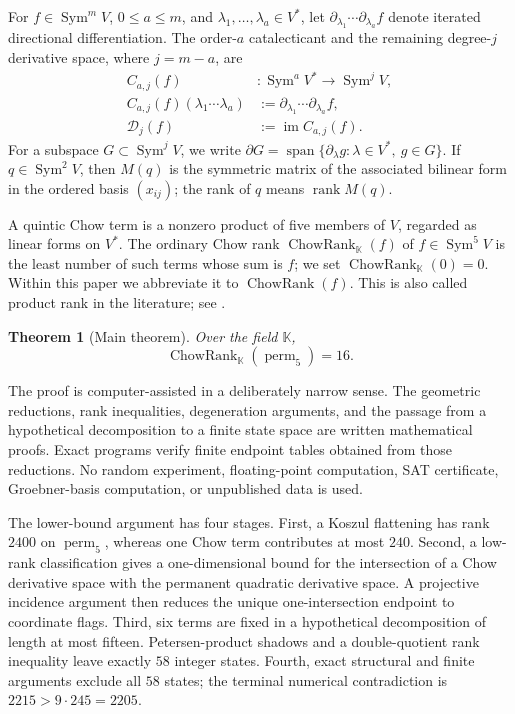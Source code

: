 \documentclass[11pt,reqno]{amsart}
\newtheorem{theorem}{Theorem}[section]
\theoremstyle{definition}
\newcommand{\K}{\mathbb K}
\newcommand{\Sym}{\operatorname{Sym}}
\newcommand{\rank}{\operatorname{rank}}
\newcommand{\im}{\operatorname{im}}
\newcommand{\Span}{\operatorname{span}}
\newcommand{\ChowRank}{\operatorname{ChowRank}}
\newcommand{\perm}{\operatorname{perm}}
\newcommand{\cD}{\mathcal D}
\begin{document}
For \(f\in\Sym^mV\), \(0\le a\le m\), and
\(\lambda_1,\ldots,\lambda_a\in V^*\), let
\(\partial_{\lambda_1}\cdots\partial_{\lambda_a}f\) denote iterated
directional differentiation. The order-\(a\) catalecticant and the remaining
degree-\(j\) derivative space, where \(j=m-a\), are
\[
 \begin{aligned}
 C_{a,j}(f)&:\Sym^aV^*\longrightarrow\Sym^jV,\\
 C_{a,j}(f)(\lambda_1\cdots\lambda_a)
   &:=\partial_{\lambda_1}\cdots\partial_{\lambda_a}f,\\
 \cD_j(f)&:=\im C_{a,j}(f).
 \end{aligned}
\]
For a subspace \(G\subset\Sym^jV\), we write
\(\partial G=\Span\{\partial_\lambda g:\lambda\in V^*,\ g\in G\}\).
If \(q\in\Sym^2V\), then \(M(q)\) is the symmetric matrix of the associated
bilinear form in the ordered basis \((x_{ij})\); the rank of \(q\) means
\(\rank M(q)\).

A quintic Chow term is a nonzero product of five members of \(V\), regarded
as linear forms on \(V^*\). The ordinary Chow rank
\(\ChowRank_{\K}(f)\) of \(f\in\Sym^5V\) is the least number of such terms
whose sum is \(f\); we set \(\ChowRank_{\K}(0)=0\). Within this paper we
abbreviate it to \(\ChowRank(f)\).
This is
also called product rank in the literature; see \cite{IltenTeitler2016}.

\begin{theorem}[Main theorem]\label{thm:main}
Over the field \(\K\),
\[
 \boxed{\ChowRank_{\K}(\perm_5)=16.}
\]
\end{theorem}

The proof is computer-assisted in a deliberately narrow sense. The geometric
reductions, rank inequalities, degeneration arguments, and the passage from a
hypothetical decomposition to a finite state space are written mathematical
proofs. Exact programs verify finite endpoint tables obtained from those
reductions. No random experiment, floating-point computation, SAT certificate,
Groebner-basis computation, or unpublished data is used.

The lower-bound argument has four stages. First, a Koszul flattening has rank
\(2400\) on \(\perm_5\), whereas one Chow term contributes at most \(240\).
Second, a low-rank classification gives a one-dimensional bound for the
intersection of a Chow derivative space with the permanent quadratic
derivative space. A projective incidence argument then reduces the unique
one-intersection endpoint to coordinate flags. Third, six terms are fixed in a
hypothetical decomposition of length at most fifteen. Petersen-product shadows
and a double-quotient rank inequality leave exactly \(58\) integer states.
Fourth, exact structural and finite arguments exclude all \(58\) states; the
terminal numerical contradiction is \(2215>9\cdot245=2205\).
\end{document}
